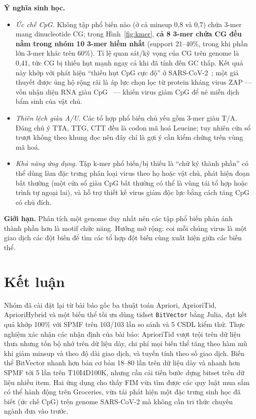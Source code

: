 \documentclass[10pt,twocolumn,letterpaper]{article}
\begin{document}
\textbf{Ý nghĩa sinh học.}
\begin{itemize}
\item \emph{Ức chế CpG.} Không tập phổ biến nào (ở cả minsup 0,8 và 0,7) chứa 3-mer mang dinucleotide CG; trong Hình~\ref{fig:kmer}, \textbf{cả 8 3-mer chứa CG đều nằm trong nhóm 10 3-mer hiếm nhất} (support 21–40\%, trong khi phần lớn 3-mer khác trên 60\%). Tỉ lệ quan sát/kỳ vọng của CG trên genome là 0,41, tức CG bị thiếu hụt mạnh ngay cả khi đã tính đến GC thấp. Kết quả này khớp với phát hiện ``thiếu hụt CpG cực độ'' ở SARS-CoV-2~\cite{xia2020}; một giả thuyết được ủng hộ rộng rãi là áp lực chọn lọc từ protein kháng virus ZAP — vốn nhận diện RNA giàu CpG~\cite{takata2017} — khiến virus giảm CpG để né miễn dịch bẩm sinh của vật chủ.
\item \emph{Thiên lệch giàu A/U.} Các tổ hợp phổ biến chủ yếu gồm 3-mer giàu T/A. Đáng chú ý TTA, TTG, CTT đều là codon mã hoá Leucine; tuy nhiên cửa sổ trượt không theo khung đọc nên đây chỉ là gợi ý cần kiểm chứng trên vùng mã hoá.
\item \emph{Khả năng ứng dụng.} Tập k-mer phổ biến/bị thiếu là ``chữ ký thành phần'' có thể dùng làm đặc trưng phân loại virus theo họ hoặc vật chủ, phát hiện đoạn bất thường (một cửa sổ giàu CpG bất thường có thể là vùng tái tổ hợp hoặc trình tự ngoại lai), và hỗ trợ thiết kế virus giảm độc lực bằng cách tăng CpG có chủ đích.
\end{itemize}
\textbf{Giới hạn.} Phân tích một genome duy nhất nên các tập phổ biến phản ánh thành phần hơn là motif chức năng. Hướng mở rộng: coi mỗi chủng virus là một giao dịch các đột biến để tìm các tổ hợp đột biến cùng xuất hiện giữa các biến thể.

\section{Kết luận}
Nhóm đã cài đặt lại từ bài báo gốc ba thuật toán Apriori, AprioriTid, AprioriHybrid và một biến thể tối ưu dùng tidset \texttt{BitVector} bằng Julia, đạt kết quả khớp 100\% với SPMF trên 103/103 lần so sánh và 5 CSDL kiểm thử. Thực nghiệm xác nhận các nhận định của bài báo: AprioriTid vượt trội trên dữ liệu thưa nhưng tốn bộ nhớ trên dữ liệu dày, chi phí mọi biến thể tăng theo hàm mũ khi giảm minsup và theo độ dài giao dịch, và tuyến tính theo số giao dịch. Biến thể BitVector nhanh hơn bản cơ bản 18–80 lần trên dữ liệu dày và nhanh hơn SPMF tới 5 lần trên T10I4D100K, nhưng cần cải tiến bước dựng bitset trên dữ liệu nhiều item. Hai ứng dụng cho thấy FIM vừa tìm được các quy luật mua sắm có thể hành động trên Groceries, vừa tái phát hiện một đặc trưng sinh học đã biết (ức chế CpG) trên genome SARS-CoV-2 mà không cần tri thức chuyên ngành đưa vào trước.
\end{document}
